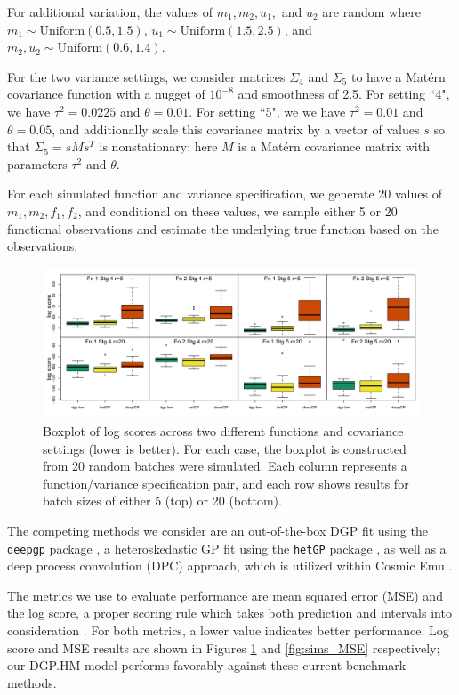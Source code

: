 \documentclass[11pt]{article}
\begin{document}
For additional variation, the values of $m_1, m_2, u_1,$ and $u_2$ are random where $m_1 \sim \text{Uniform}(0.5,1.5)$, $u_1 \sim \text{Uniform}(1.5,2.5)$, and $m_2,u_2 \sim \text{Uniform}(0.6,1.4)$. 
      
For the two variance settings, we consider matrices $\Sigma_4$ and $\Sigma_5$ to have a Mat\'ern covariance function with a nugget of $10^{-8}$ and smoothness of 2.5. For setting ``4", we have $\tau^2=0.0225$ and $\theta=0.01$. For setting ``5", we we have $\tau^2=0.01$ and $\theta=0.05$, and additionally scale this covariance matrix by a vector of values $s$ so that $\Sigma_5 = s M s^T$ is nonstationary; here $M$ is a Mat\'ern covariance matrix with parameters $\tau^2$ and $\theta$.

For each simulated function and variance specification, we generate 20 values of $m_1, m_2, f_1, f_2$, and conditional on these values, we sample either 5 or 20 functional observations and estimate the underlying true function based on the observations.

\begin{figure}[t]
    \centering
    \includegraphics[width=6in]{sims_logS.png}
    \caption{Boxplot of log scores across two different functions and covariance settings (lower is better). For each case, the boxplot is constructed from 20 random batches were simulated. Each column represents a function/variance specification pair, and each row shows results for batch sizes of either 5 (top) or 20 (bottom).}
    \label{fig:sims_logS}
\end{figure}

The competing methods we consider are an out-of-the-box DGP fit using the \texttt{deepgp} package \citep{sauer2023active}, a heteroskedastic GP fit using the \texttt{hetGP} package \citep{binois2018practical, binois2021hetgp}, as well as a deep process convolution (DPC) approach, which is utilized within Cosmic Emu \citep{moran2023mira}. 

The metrics we use to evaluate performance are mean squared error (MSE) and the log score, a proper scoring rule which takes both prediction and intervals into consideration \citep{gneiting2007strictly}. For both metrics, a lower value indicates better performance. Log score and MSE results are shown in Figures \ref{fig:sims_logS} and \ref{fig:sims_MSE} respectively; our DGP.HM model performs favorably against these current benchmark methods.
\end{document}
